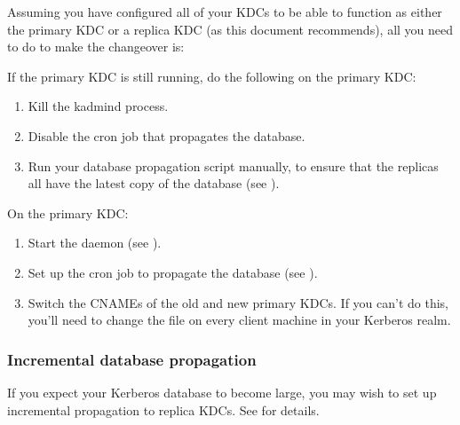 \documentclass[letterpaper,10pt,english]{sphinxmanual}
\begin{document}
\sphinxAtStartPar
Assuming you have configured all of your KDCs to be able to function
as either the primary KDC or a replica KDC (as this document
recommends), all you need to do to make the changeover is:

\sphinxAtStartPar
If the primary KDC is still running, do the following on the 
primary KDC:
\begin{enumerate}
%
\item {} 
\sphinxAtStartPar
Kill the kadmind process.

\item {} 
\sphinxAtStartPar
Disable the cron job that propagates the database.

\item {} 
\sphinxAtStartPar
Run your database propagation script manually, to ensure that the
replicas all have the latest copy of the database (see
{\hyperref[\detokenize{admin/install_kdc:kprop-to-replicas}]{}}).

\end{enumerate}

\sphinxAtStartPar
On the  primary KDC:
\begin{enumerate}
%
\item {} 
\sphinxAtStartPar
Start the {\hyperref[\detokenize{admin/admin_commands/kadmind:kadmind-8}]{}} daemon (see {\hyperref[\detokenize{admin/install_kdc:start-kdc-daemons}]{}}).

\item {} 
\sphinxAtStartPar
Set up the cron job to propagate the database (see
{\hyperref[\detokenize{admin/install_kdc:kprop-to-replicas}]{}}).

\item {} 
\sphinxAtStartPar
Switch the CNAMEs of the old and new primary KDCs.  If you can’t do
this, you’ll need to change the {\hyperref[\detokenize{admin/conf_files/krb5_conf:krb5-conf-5}]{}} file on every
client machine in your Kerberos realm.

\end{enumerate}


\subsubsection{Incremental database propagation}
\label{\detokenize{admin/install_kdc:incremental-database-propagation}}
\sphinxAtStartPar
If you expect your Kerberos database to become large, you may wish to
set up incremental propagation to replica KDCs.  See
{\hyperref[\detokenize{admin/database:incr-db-prop}]{}} for details.
\end{document}
